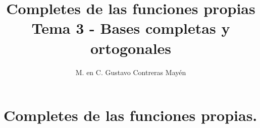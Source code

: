 
\title{Completes de las funciones propias \\ \large {Tema 3 - Bases completas y ortogonales}\vspace{-3ex}}

\author{M. en C. Gustavo Contreras Mayén}
\date{ }

\pagestyle{fancy}
\fancyhf{}
\lhead{\leftmark}
\rfoot{\thepage}
\setlength{\headheight}{16pt}%



\maketitle
\fontsize{14}{14}\selectfont
\tableofcontents
\newpage

\section{Completes de las funciones propias.}

